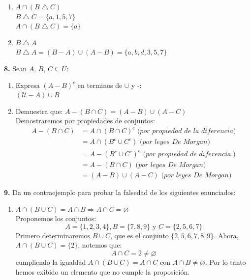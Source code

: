 \documentclass[12pt]{article}
\begin{document}
\begin{enumerate}[label=\alph*)]
\begin{enumerate}
        \item $A \cap (B \bigtriangleup C)$\\
        $B \bigtriangleup C = \{a, 1, 5, 7\}$\\
        $A \cap (B \bigtriangleup C) = \{a\}$\\

        \item $ B \bigtriangleup A$\\
        $B \bigtriangleup A = (B - A) \cup (A - B) = \{a, b, d, 3, 5, 7\}$
    \end{enumerate}
\end{enumerate}

%
%
\textbf{8.} Sean $A$, $B$, $C \subseteq U$:
\begin{enumerate}[label=\alph*)]
    \item Expresa $(A - B)^c$ en terminos de $\cup$ y -:\\
    $(\mathcal{U} - A) \cup B$

    \item Demuestra que: $A - (B \cap C) = (A - B) \cup (A - C)$\\
    Demostraremos por propiedades de conjuntos:
    \begin{align*}
        A - (B \cap C) &= A \cap (B \cap C)^c \textit{ (por propiedad de la diferencia)}\\
        &= A \cap (B^c \cup C^c) \textit{ (por leyes De Morgan)}\\
        &= A - (B^c \cup C^c)^c \textit{ (por propiedad de diferencia.)}\\
        &= A - (B \cap C) \textit{ (por leyes De Morgan)}\\
        &= (A - B) \cup (A - C) \textit{ (por leyes De Morgan)}
    \end{align*}
\end{enumerate}

% 
%
\textbf{9.} Da un contraejemplo para probar la falsedad de los siguientes enunciados:

\begin{enumerate}[label=\alph*)]
    \item $A \cap (B \cup C) = A \cap B \Longrightarrow A \cap C = \varnothing$\\

    Proponemos los conjuntos:
    \[A = \{1, 2, 3, 4\}, B = \{7, 8, 9\} \text{ y } C = \{2, 5, 6, 7\}\]
    Primero determinaremos $B \cup C$, que es el conjunto $\{2, 5, 6, 7, 8, 9\}$. Ahora, $A \cap (B \cup C) = \{2\}$, notemos que:
    \[A \cap C = 2 \neq \varnothing\]
    cumpliendo la igualdad $A \cap (B \cup C) = A \cap C$ con $A \cap B \neq \varnothing$. Por lo tanto hemos exibido un elemento 
    que no cumple la proposición.
\end{enumerate}
\end{document}
